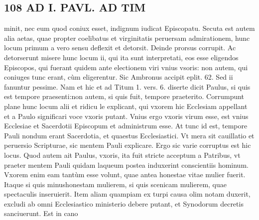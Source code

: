 \documentclass{article}
\begin{document}
\begin{pages}
\section*{108 AD I. PAVL. AD TIM }\pstart minit, nec eum quod coniux esset, indignum iudicat Episcopatu.  \pend\pstart Secuta est autem alia aetas, quae propter coelibatus et virginitatis peruersam admirationem, hunc locum primum a vero sensu deflexit et detorsit. Deinde prorsus corrupit. Ac detorserunt misere hunc locum ii, qui ita sunt interpretati, eos esse eligendos Episcopos, qui fuerant quidem ante electionem viri vnius vsoris: non autem, qui coniuges tunc erant, cùm eligerentur. Sic Ambronus accipit eplit. 62. Sed ii fanuntur pessime. Nam et hic et ad Titum 1. vers. 6. diserte dicit Paulus, si quis est tempore praesenti:non autem, si quis fuit, tempore praeterito.  \pend\pstart Corrumpunt plane hunc locum alii et ridicu le explicant, qui vxorem hic Ecclesiam appellant et a Paulo significari voce vxoris putant. Vnius ergo vxoris virum esse, est vnius Ecclesiae et Sacerdotii Episcopum et administrum esse. At tunc id est, tempore Pauli nondum erant Sacerdotia, et quaestus Ecclesiastici. Vt mera sit cauillatio et peruersio Scripturae, sic mentem Pauli explicare. Ergo sic varie corruptus est hic locus. Quod autem ait Paulus, vxoris, ita fuit stricte acceptum a Patribus, vt praeter mentem Pauli quidam laqueum postea induxerint conscientiis hominum.  \pend\pstart Vxorem enim eam tantùm esse volunt, quae antea honestae vitae mulier fuerit. Itaque si quis minushonestam mulierem, si quis scenicam mulierem, quae spectaculis inseruierit. Item aliam quampiam ex turpi causa olim notam duxerit, excludi ab omni Ecclesiastico ministerio debere putant, et Synodorum decretis sanciuerunt. Est in cano\pend

\end{pages}
\end{document}
